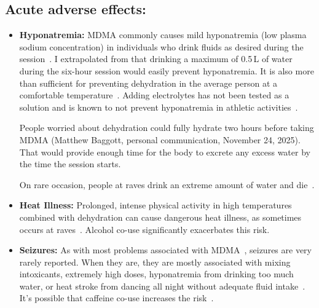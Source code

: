 \documentclass[11pt,oneside]{book}
\let\cite\parencite
\begin{document}
\subsection*{Acute adverse effects:}
\begin{itemize}
    \item \textbf{Hyponatremia:} MDMA commonly causes mild hyponatremia (low plasma sodium concentration) in individuals who drink fluids as desired during the session~\cite{atilaHyponatremia}. I extrapolated from \textcite{baggottWater} that drinking a maximum of 0.5\,L of water during the six-hour session would easily prevent hyponatremia. It is also more than sufficient for preventing dehydration in the average person at a comfortable temperature~\cite{valtinWater}. Adding electrolytes has not been tested as a solution and is known to not prevent hyponatremia in athletic activities~\cite{hew2008statement}.
    
    People worried about dehydration could fully hydrate two hours before taking MDMA (Matthew Baggott, personal communication, November 24, 2025). That would provide enough time for the body to excrete any excess water by the time the session starts.

    On rare occasion, people at raves drink an extreme amount of water and die~\cite{riggDeaths}.
    \item \textbf{Heat Illness:} Prolonged, intense physical activity in high temperatures combined with dehydration can cause dangerous heat illness, as sometimes occurs at raves~\cite{vanOverheatingAlcohol}. Alcohol co-use significantly exacerbates this risk.
    \item \textbf{Seizures:} As with most problems associated with MDMA~\cite{riggDeaths}, seizures are very rarely reported. When they are, they are mostly associated with mixing intoxicants, extremely high doses, hyponatremia from drinking too much water, or heat stroke from dancing all night without adequate fluid intake~\cite{freidelSeizures}. It's possible that caffeine co-use increases the risk~\cite{vanattouCaffeine}.
\end{itemize}
\end{document}
